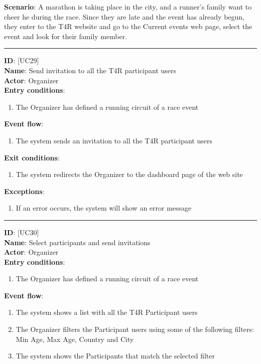 \documentclass[a4paper, hidelinks, 12pt]{report}
\newcommand\usecase[1]{ [UC#1] }
\begin{document}
\begin{itemize}
		\textbf{Scenario}: A marathon is taking place in the city, and a runner's family want to cheer he during the race. Since they are late and the event has already begun, they enter to the T4R website and go to the Current events web page, select the event and look for their family member. \\
		\rule{\linewidth}{0.4pt}
		\textbf{ID}: \usecase{29} \\
		\textbf{Name}: Send invitation to all the T4R participant users \\
		\textbf{Actor}: Organizer \\
		\textbf{Entry conditions}:
		\begin{enumerate}
			\item{The Organizer has defined a running circuit of a race event}
		\end{enumerate}
		\textbf{Event flow}:
		\begin{enumerate}
			\item{The system sends an invitation to all the T4R participant users}
		\end{enumerate}
		\textbf{Exit conditions}:
		\begin{enumerate}
			\item{The system redirects the Organizer to the dashboard page of the web site}
		\end{enumerate}
		\textbf{Exceptions}:
		\begin{enumerate}
			\item{If an error occurs, the system will show an error message}
		\end{enumerate}
		\rule{\linewidth}{0.4pt}
		\textbf{ID}: \usecase{30} \\
		\textbf{Name}: Select participants and send invitations \\
		\textbf{Actor}: Organizer \\
		\textbf{Entry conditions}:
		\begin{enumerate}
			\item{The Organizer has defined a running circuit of a race event}
		\end{enumerate}
		\textbf{Event flow}:
		\begin{enumerate}
			\item{The system shows a list with all the T4R Participant users}
			\item{The Organizer filters the Participant users using some of the following filters: Min Age, Max Age, Country and City}
			\item{The system shows the Participants that match the selected filter}

\end{enumerate}
\end{itemize}
\end{document}
